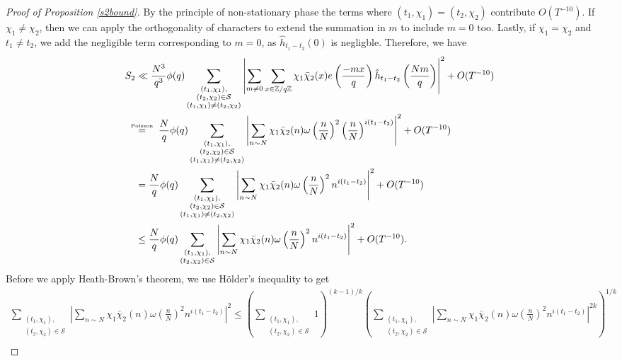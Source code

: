 \begin{proof}[Proof of Proposition \ref{s2bound}]
    By the principle of non-stationary phase the terms where $(t_1,\chi_1)=(t_2,\chi_2)$ contribute $O(T^{-10})$. If $\chi_1\neq \chi_2$, then we can apply the orthogonality of characters to extend the summation in $m$ to include $m=0$ too. Lastly, if $\chi_1=\chi_2$ and $t_1\neq t_2$, we add the negligible term corresponding to $m=0$, as $\hat h_{t_1-t_2}(0)$ is negligble.
    Therefore, we have \begin{align*}
        S_2&\ll \frac{N^3}{q^3} \phi(q) \sum_{\substack{(t_1,\chi_1),\\(t_2,\chi_2)\in\mathcal{S}\\ (t_1,\chi_1)\neq (t_2,\chi_2)}} \left|\sum_{m\neq 0} \sum_{x \in \mathbb{Z}/q\mathbb{Z}}\chi_1\bar{\chi}_2(x) e\left(\frac{-mx}{q}\right)
        \hat{h}_{t_1-t_2}\left(\frac{Nm}{q}\right)\right|^2 + O(T^{-10})\\ 
        &\stackeq{Poisson} \quad \frac{N}{q} \phi(q) \sum_{\substack{(t_1,\chi_1),\\(t_2,\chi_2)\in\mathcal{S}\\ (t_1,\chi_1)\neq (t_2,\chi_2)}} \left|\sum_{n\sim N} \chi_1\bar\chi_2(n)\omega\left(\frac{n}{N}\right)^2\left(\frac{n}{N}\right)^{i(t_1-t_2)}\right|^2 + O(T^{-10})\\
        &=\frac{N}{q} \phi(q) \sum_{\substack{(t_1,\chi_1),\\(t_2,\chi_2)\in\mathcal{S}\\ (t_1,\chi_1)\neq (t_2,\chi_2)}} \left|\sum_{n\sim N} \chi_1\bar\chi_2(n)\omega\left(\frac{n}{N}\right)^2n^{i(t_1-t_2)}\right|^2 + O(T^{-10})\\
        & \leq \frac{N}{q} \phi(q) \sum_{\substack{(t_1,\chi_1),\\(t_2,\chi_2)\in\mathcal{S}}} \left|\sum_{n\sim N} \chi_1\bar\chi_2(n)\omega\left(\frac{n}{N}\right)^2n^{i(t_1-t_2)}\right|^2 + O(T^{-10}).
    \end{align*}
    Before we apply Heath-Brown's theorem, we use H\"older's inequality to get \begin{align*}
        \sum_{\substack{(t_1,\chi_1),\\(t_2,\chi_2)\in\mathcal{S}}} \left|\sum_{n\sim N} \chi_1\bar\chi_2(n)\omega\left(\frac{n}{N}\right)^2n^{i(t_1-t_2)}\right|^2\leq \left(\sum_{\substack{(t_1,\chi_1),\\(t_2,\chi_2)\in\mathcal{S}}} 1\right)^{(k-1)/k}\left(\sum_{\substack{(t_1,\chi_1),\\(t_2,\chi_2)\in\mathcal{S}}} \left|\sum_{n\sim N} \chi_1\bar\chi_2(n)\omega\left(\frac{n}{N}\right)^2n^{i(t_1-t_2)}\right|^{2k}\right)^{1/k}\\

\end{align*}
\end{proof}
